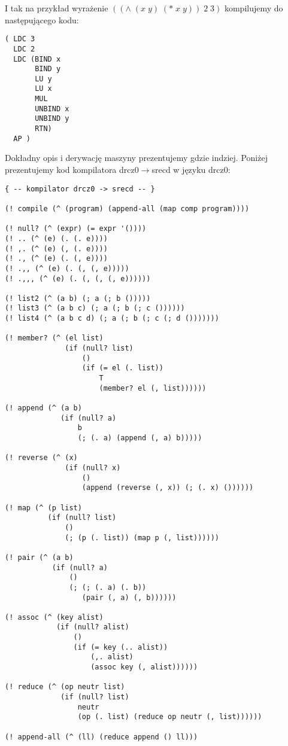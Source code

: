 \documentclass[a4paper]{article}
\begin{document}
I tak na przykład wyrażenie $((\wedge\; (x\; y)\; (*\; x\; y))\; 2\; 3)$ kompilujemy do następującego kodu:\\

\begin{verbatim}
( LDC 3
  LDC 2
  LDC (BIND x
       BIND y
       LU y
       LU x
       MUL
       UNBIND x
       UNBIND y
       RTN)
  AP )
\end{verbatim}

Dokładny opis i derywację maszyny prezentujemy gdzie indziej. Poniżej prezentujemy kod kompilatora
drcz0$\rightarrow$srecd w języku drcz0:


\small
\begin{verbatim}
{ -- kompilator drcz0 -> srecd -- }

(! compile (^ (program) (append-all (map comp program))))

(! null? (^ (expr) (= expr '())))
(! .. (^ (e) (. (. e))))
(! ,. (^ (e) (, (. e))))
(! ., (^ (e) (. (, e))))
(! .,, (^ (e) (. (, (, e)))))
(! .,,, (^ (e) (. (, (, (, e))))))

(! list2 (^ (a b) (; a (; b ()))))
(! list3 (^ (a b c) (; a (; b (; c ())))))
(! list4 (^ (a b c d) (; a (; b (; c (; d ()))))))

(! member? (^ (el list)
              (if (null? list)
                  ()
                  (if (= el (. list))
                      T
                      (member? el (, list))))))

(! append (^ (a b)
             (if (null? a)
                 b
                 (; (. a) (append (, a) b)))))

(! reverse (^ (x)
              (if (null? x)
                  ()
                  (append (reverse (, x)) (; (. x) ())))))

(! map (^ (p list)
          (if (null? list)
              ()
              (; (p (. list)) (map p (, list))))))

(! pair (^ (a b)
           (if (null? a)
               ()
               (; (; (. a) (. b))
                  (pair (, a) (, b))))))

(! assoc (^ (key alist)
            (if (null? alist)
                ()
                (if (= key (.. alist))
                    (,. alist)
                    (assoc key (, alist))))))

(! reduce (^ (op neutr list)
             (if (null? list)
                 neutr
                 (op (. list) (reduce op neutr (, list))))))

(! append-all (^ (ll) (reduce append () ll)))


\end{verbatim}
\end{document}
